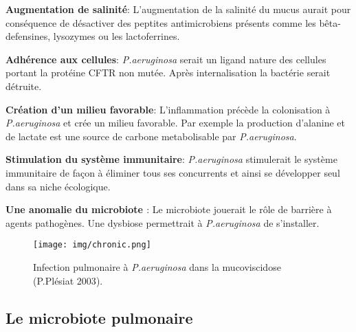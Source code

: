 \documentclass[12pt,a4paper]{article}
\begin{document}
\textbf{Augmentation de salinité}\cite{Davies}:
L'augmentation de la salinité du mucus aurait pour conséquence de désactiver des peptites antimicrobiens présents comme les bêta-defensines, lysozymes ou les lactoferrines.

\textbf{Adhérence aux cellules}\cite{Davies}:
\textit{P.aeruginosa} serait un ligand nature des cellules portant la protéine CFTR non mutée. Après internalisation la bactérie serait détruite.

\textbf{Création d'un milieu favorable}:
L'inflammation précède la colonisation à \textit{P.aeruginosa} et crée un milieu favorable.
Par exemple la production d'alanine et de lactate \cite{Boulette2009} est une source de carbone metabolisable par \textit{P.aeruginosa}.

\textbf{Stimulation du système immunitaire}:
\textit{P.aeruginosa} stimulerait le système immunitaire de façon à éliminer tous ses concurrents et ainsi se développer seul dans sa niche écologique.

\textbf{Une anomalie du microbiote \cite{HoMan2017}}:
Le microbiote jouerait le rôle de barrière à agents pathogènes. Une dysbiose permettrait à \textit{P.aeruginosa} de s'installer.


\begin{figure}[ht]
\begin{center}
\texttt{[image: img/chronic.png]}\hfill
\end{center}
\caption{Infection pulmonaire à \textit{P.aeruginosa} dans la mucoviscidose (P.Plésiat 2003\cite{Plesiat}).}
\label{bach}
\end{figure}


\subsection{Le microbiote pulmonaire}
\end{document}
